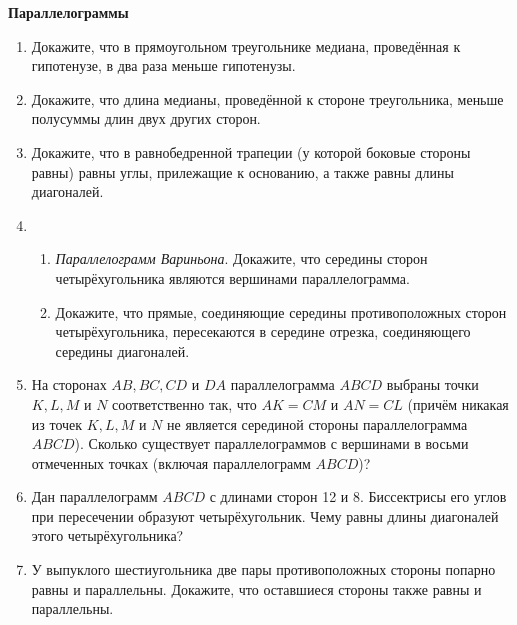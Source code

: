 \documentclass{article}
\begin{document}
\large


\begin{center}
\textbf{Параллелограммы}
\end{center}

\begin{enumerate}[label*=\protect\fbox{\arabic{enumi}}]

\item Докажите, что в прямоугольном треугольнике медиана, проведённая к гипотенузе, в два раза меньше гипотенузы.

\item Докажите, что длина медианы, проведённой к стороне треугольника, меньше полусуммы длин двух других сторон.

\item Докажите, что в равнобедренной трапеции (у которой боковые стороны равны) равны углы, прилежащие к основанию, а также равны длины диагоналей.

\item
\begin{enumerate}
	\item \textit{Параллелограмм Вариньона}. Докажите, что середины сторон четырёхугольника являются вершинами параллелограмма.

 	\item Докажите, что прямые, соединяющие середины противоположных сторон четырёхугольника, пересекаются в середине отрезка, соединяющего середины диагоналей.
\end{enumerate}

\item На сторонах $AB, BC, CD$ и $DA$ параллелограмма $ABCD$ выбраны точки $K, L, M$ и $N$ соответственно так, что $AK=CM$ и $AN=CL$ (причём никакая из точек $K, L, M$ и $N$ не является серединой стороны параллелограмма $ABCD$). Сколько существует параллелограммов с вершинами в восьми отмеченных точках (включая параллелограмм $ABCD$)?

\item Дан параллелограмм $ABCD$ с длинами сторон 12 и 8. Биссектрисы его углов при пересечении образуют четырёхугольник. Чему равны длины диагоналей этого четырёхугольника?

\item У выпуклого шестиугольника две пары противоположных стороны попарно равны и параллельны. Докажите, что оставшиеся стороны также равны и параллельны.


\end{enumerate}
\end{document}
